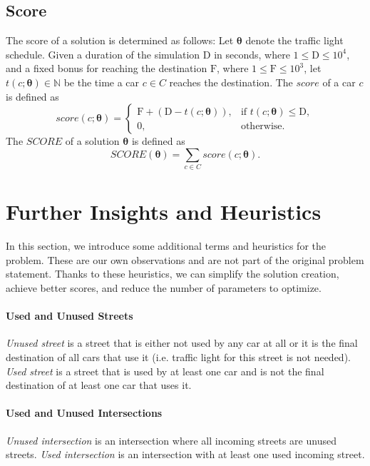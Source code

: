 \newpage

\subsection{Score}

The score of a solution is determined as follows: Let $\bm{\theta}$ denote the traffic light schedule. Given a duration of the simulation $\mathrm{D}$ in seconds, where $1 \leq \mathrm{D} \leq 10^4$, and a fixed bonus for reaching the destination $\mathrm{F}$, where $1 \leq \mathrm{F} \leq 10^3$, let $t(c; \bm{\theta}) \in \mathbb{N}$ be the time a car $c \in C$ reaches the destination. The $score$ of a car $c$ is defined as
\begin{equation}
    score(c; \bm{\theta}) =
    \begin{cases}
        \mathrm{F} + (\mathrm{D} - t(c; \bm{\theta})), & \text{if $t(c; \bm{\theta}) \leq \mathrm{D}$}, \\
        0, & \text{otherwise}.
    \end{cases}
\end{equation}
The $SCORE$ of a solution $\bm{\theta}$ is defined as
\begin{equation}
    SCORE(\bm{\theta}) = \sum_{c \in C} score(c; \bm{\theta}).
\end{equation}

\section{Further Insights and Heuristics} \label{sec:further_insights_and_heuristics}

In this section, we introduce some additional terms and heuristics for the problem. These are our own observations and are not part of the original problem statement. Thanks to these heuristics, we can simplify the solution creation, achieve better scores, and reduce the number of parameters to optimize.

\paragraph{Used and Unused Streets} \textit{Unused street} is a street that is either not used by any car at all or it is the final destination of all cars that use it (i.e. traffic light for this street is not needed). \textit{Used street} is a street that is used by at least one car and is not the final destination of at least one car that uses it.

\paragraph{Used and Unused Intersections} \textit{Unused intersection} is an intersection where all incoming streets are unused streets. \textit{Used intersection} is an intersection with at least one used incoming street.

